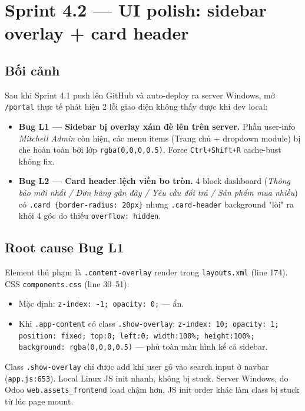 \chapter{Sprint 4.2 --- UI polish: sidebar overlay + card header}

\section{Bối cảnh}

Sau khi Sprint 4.1 push lên GitHub và auto-deploy ra server Windows, mở \texttt{/portal} thực tế phát hiện 2 lỗi giao diện không thấy được khi dev local:

\begin{itemize}
    \item \textbf{Bug L1 --- Sidebar bị overlay xám đè lên trên server.} Phần user-info \emph{Mitchell Admin} còn hiện, các menu items (Trang chủ + dropdown module) bị che hoàn toàn bởi lớp \texttt{rgba(0,0,0,0.5)}. Force \texttt{Ctrl+Shift+R} cache-bust không fix.
    \item \textbf{Bug L2 --- Card header lệch viền bo tròn.} 4 block dashboard (\emph{Thông báo mới nhất / Đơn hàng gần đây / Yêu cầu đổi trả / Sản phẩm mua nhiều}) có \texttt{.card \{border-radius: 20px\}} nhưng \texttt{.card-header} background "lòi" ra khỏi 4 góc do thiếu \texttt{overflow: hidden}.
\end{itemize}

\section{Root cause Bug L1}

Element thủ phạm là \texttt{.content-overlay} render trong \texttt{layouts.xml} (line 174). CSS \texttt{components.css} (line 30--51):

\begin{itemize}
    \item Mặc định: \texttt{z-index: -1; opacity: 0;} --- ẩn.
    \item Khi \texttt{.app-content} có class \texttt{.show-overlay}: \texttt{z-index: 10; opacity: 1; position: fixed; top:0; left:0; width:100\%; height:100\%; background: rgba(0,0,0,0.5)} --- phủ toàn màn hình kể cả sidebar.
\end{itemize}

Class \texttt{.show-overlay} chỉ được add khi user gõ vào search input ở navbar (\texttt{app.js:653}). Local Linux JS init nhanh, không bị stuck. Server Windows, do Odoo \texttt{web.assets\_frontend} load chậm hơn, JS init order khác làm class bị stuck từ lúc page mount.

